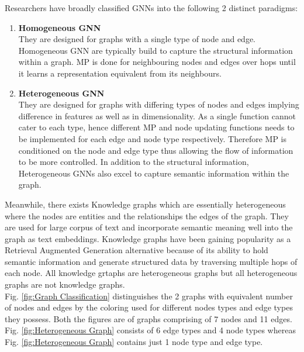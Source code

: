 \documentclass{report} %
\begin{document}
Researchers have broadly classified \ac{GNN}s into the following 2 distinct paradigms:
\begin{enumerate}[nosep]
    \item \textbf{Homogeneous \ac{GNN}} \\
        They are designed for graphs with a single type of node and edge. 
        Homogeneous \ac{GNN} are typically build to capture the structural information within a graph.
        \ac{MP} is done for neighbouring nodes and edges over hops until it learns a representation equivalent from its neighbours.
    \item \textbf{Heterogeneous \ac{GNN}} \\    
        They are designed for graphs with differing types of nodes and edges implying difference in features as well as in dimensionality.
        As a single function cannot cater to each type, hence different \ac{MP} and node updating functions needs to be implemented for each edge and node type respectively.
        Therefore \ac{MP} is conditioned on the node and edge type thus allowing the flow of information to be more controlled. 
        In addition to the structural information, Heterogeneous \ac{GNN}s also excel to capture semantic information within the graph.\\
\end{enumerate}

Meanwhile, there exists Knowledge graphs which are essentially heterogeneous where the nodes are entities and the relationships the edges of the graph.
They are used for large corpus of text and incorporate semantic meaning well into the graph as text embeddings.
Knowledge graphs have been gaining popularity as a Retrieval Augmented Generation alternative because of its ability to hold semantic information 
and generate structured data by traversing multiple hops of each node.
All knowledge grtaphs are heterogeneous graphs but all heterogeneous graphs are not knowledge graphs.\\

Fig. \ref{fig:Graph Classification} distinguishes the 2 graphs with equivalent number of nodes and edges by the coloring used for different nodes types and edge types 
they possess.
Both the figures are of graphs comprising of 7 nodes and 11 edges. 
Fig. \ref{fig:Heterogeneous Graph} consists of 6 edge types and 4 node types whereas Fig. \ref{fig:Heterogeneous Graph} contains just 1 node type and edge type.
\end{document}
